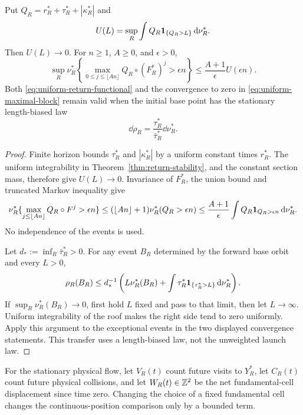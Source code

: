 \begin{lemma}
\label{lem:uniform-maximal-block}
Put $Q_R=r_R^*+\tau_R^*+|\kappa_R^*|$ and
\[
 U(L)=\sup_R\int Q_R\mathbf1_{\{Q_R>L\}}\,\mathrm d\nu_R^*.
\]
Then $U(L)\to0$. For $n\ge1$, $A\ge0$, and $\epsilon>0$,
\begin{equation}\label{eq:uniform-maximal-block}
 \sup_R\nu_R^*\left\{
 \max_{0\le j\le\lfloor An\rfloor}Q_R\circ(F_R^*)^j>\epsilon n
 \right\}\le\frac{A+1}{\epsilon}U(\epsilon n).
\end{equation}
Both \eqref{eq:uniform-return-functional} and the convergence to zero
in \eqref{eq:uniform-maximal-block} remain valid when the initial
base point has the stationary length-biased law
\begin{equation}\label{eq:length-biased-base-v4}
 \dd\rho_R=\frac{\tau_R^*}{\bar\tau_R^*}\dd\nu_R^*.
\end{equation}
\end{lemma}
\begin{proof}
Finite horizon bounds $\tau_R^*$ and $|\kappa_R^*|$ by a uniform
constant times $r_R^*$. The uniform integrability in
Theorem~\ref{thm:return-stability}, and the constant section mass,
therefore give $U(L)\to0$. Invariance of $F_R^*$, the union bound
and truncated Markov inequality give
\[
 \nu_R^*\{\max_{j\le\lfloor An\rfloor}Q_R\circ F^j>\epsilon n\}
 \le (\lfloor An\rfloor+1)\nu_R^*(Q_R>\epsilon n)
 \le\frac{A+1}{\epsilon}\int Q_R\mathbf1_{Q_R>\epsilon n}\,\mathrm d\nu_R^*.
\]
No independence of the events is used.

Let $d_*:=\inf_R\bar\tau_R^*>0$. For any event $B_R$ determined
by the forward base orbit and every $L>0$,
\begin{equation}\label{eq:length-bias-transfer-v4}
 \rho_R(B_R)\le d_*^{-1}\left(
 L\nu_R^*(B_R)+\int\tau_R^*\one_{\{\tau_R^*>L\}}\dd\nu_R^*\right).
\end{equation}
If $\sup_R\nu_R^*(B_R)\to0$, first hold $L$ fixed and pass to that
limit, then let $L\to\infty$. Uniform integrability of the roof
makes the right side tend to zero uniformly. Apply this argument to
the exceptional events in the two displayed convergence statements.
This transfer uses a length-biased law, not the unweighted launch law.
\end{proof}

For the stationary physical flow, let $V_R(t)$ count future visits to
$Y_R^*$, let $C_R(t)$ count future physical collisions, and let
$W_R(t)\in\mathbb Z^2$ be the net fundamental-cell displacement since time
zero. Changing the choice of a fixed fundamental cell changes the
continuous-position comparison only by a bounded term.

